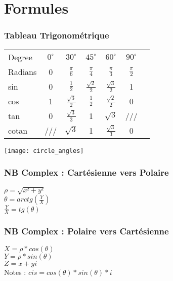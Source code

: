 
\newpage
\chapter{Formules}

\subsection{Tableau Trigonométrique}
\begin{tabular}{|l|c|c|c|c|c|c|}
  \hline
  Degree & $0^{\circ}$ & $30^{\circ}$ & $45^{\circ}$  & $60^{\circ}$ & $90^{\circ}$ \\
  Radians & 0 & $\frac{\pi}{6}$ & $\frac{\pi}{4}$ & $\frac{\pi}{3}$ &  $\frac{\pi}{2}$ \\
  \hline
  sin & 0 & $\frac{1}{2}$ & $\frac{\sqrt{2}} {2}$ & $\frac{\sqrt{3}} {2}$ & 1 \\
  cos & 1 & $\frac{\sqrt{3}} {2}$ & $\frac{1}{2}$ & $\frac{\sqrt{2}} {2}$ & 0 \\
  tan & 0 & $\frac{\sqrt{3}} {3}$ & 1 & $\sqrt{3}$ & /// \\
  cotan & /// & $\sqrt{3}$ & 1 & $\frac{\sqrt{3}} {3}$ & 0 \\
  \hline
\end{tabular}

\vspace{4mm} %
\texttt{[image: circle\_angles]}


\newpage
\vspace{4mm} %
\subsection{NB Complex : Cartésienne vers Polaire}
$\rho = \sqrt{x²+y²}$ \\
$\theta = arctg(\frac{Y}{X})$ \\
$\frac{Y}{X} = tg(\theta)$ \\

\vspace{4mm} %
\subsection{NB Complex : Polaire vers Cartésienne}
$X= \rho * cos(\theta)$ \\
$Y= \rho * sin(\theta)$ \\
$Z= x+yi $ \\
Notes : $cis = cos(\theta) * sin(\theta) *i$ \\

